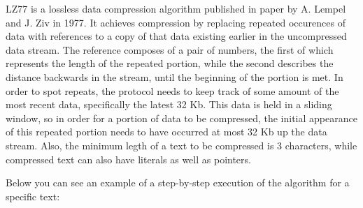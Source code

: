 LZ77 is a lossless data compression algorithm published in paper by A. Lempel
and J. Ziv in 1977. \cite{lz77} It achieves compression by replacing repeated
occurences of data with references to a copy of that data existing earlier in
the uncompressed data stream. The reference composes of a pair of numbers, the
first of which represents the length of the repeated portion, while the second
describes the distance backwards in the stream, until the beginning of the
portion is met. In order to spot repeats, the protocol needs to keep track of
some amount of the most recent data, specifically the latest 32 Kb. This data is
held in a sliding window, so in order for a portion of data to be compressed,
the initial appearance of this repeated portion needs to have occurred at most
32 Kb up the data stream. Also, the minimum legth of a text to be compressed is
3 characters, while compressed text can also have literals as well as pointers.

Below you can see an example of a step-by-step execution of the algorithm for a
specific text:

